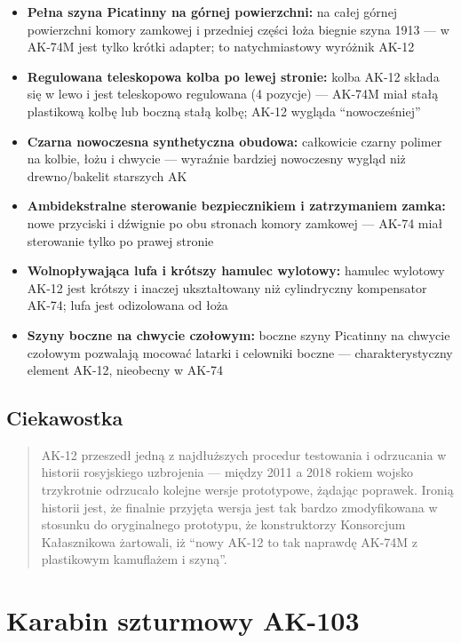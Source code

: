 \documentclass[12pt,openany,oneside]{book}
\providecommand{\tightlist}{%
  \setlength{\itemsep}{0pt}\setlength{\parskip}{0pt}}
\begin{document}
\begin{itemize}
\tightlist
\item
  \textbf{Pełna szyna Picatinny na górnej powierzchni:} na całej górnej
  powierzchni komory zamkowej i przedniej części łoża biegnie szyna 1913
  --- w AK-74M jest tylko krótki adapter; to natychmiastowy wyróżnik
  AK-12
\item
  \textbf{Regulowana teleskopowa kolba po lewej stronie:} kolba AK-12
  składa się w lewo i jest teleskopowo regulowana (4 pozycje) --- AK-74M
  miał stałą plastikową kolbę lub boczną stałą kolbę; AK-12 wygląda
  ``nowocześniej''
\item
  \textbf{Czarna nowoczesna synthetyczna obudowa:} całkowicie czarny
  polimer na kolbie, łożu i chwycie --- wyraźnie bardziej nowoczesny
  wygląd niż drewno/bakelit starszych AK
\item
  \textbf{Ambidekstralne sterowanie bezpiecznikiem i zatrzymaniem
  zamka:} nowe przyciski i dźwignie po obu stronach komory zamkowej ---
  AK-74 miał sterowanie tylko po prawej stronie
\item
  \textbf{Wolnopływająca lufa i krótszy hamulec wylotowy:} hamulec
  wylotowy AK-12 jest krótszy i inaczej ukształtowany niż cylindryczny
  kompensator AK-74; lufa jest odizolowana od łoża
\item
  \textbf{Szyny boczne na chwycie czołowym:} boczne szyny Picatinny na
  chwycie czołowym pozwalają mocować latarki i celowniki boczne ---
  charakterystyczny element AK-12, nieobecny w AK-74
\end{itemize}

\section{Ciekawostka}\label{ciekawostka-47}

\begin{quote}
AK-12 przeszedł jedną z najdłuższych procedur testowania i odrzucania w
historii rosyjskiego uzbrojenia --- między 2011 a 2018 rokiem wojsko
trzykrotnie odrzucało kolejne wersje prototypowe, żądając poprawek.
Ironią historii jest, że finalnie przyjęta wersja jest tak bardzo
zmodyfikowana w stosunku do oryginalnego prototypu, że konstruktorzy
Konsorcjum Kałasznikowa żartowali, iż ``nowy AK-12 to tak naprawdę
AK-74M z plastikowym kamuflażem i szyną''.
\end{quote}

\chapter{Karabin szturmowy AK-103}\label{karabin-szturmowy-ak-103}
\end{document}
